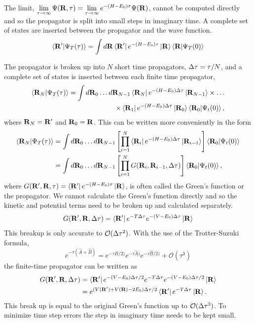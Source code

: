 The limit, $\lim\limits_{\tau\rightarrow\infty}\Psi(\mathbf{R},\tau) = \lim\limits_{\tau\rightarrow\infty}e^{-(H-E_0)\tau}\Psi(\mathbf{R})$, cannot be computed directly and so the propagator is split into small steps in imaginary time. A complete set of states are inserted between the propagator and the wave function.
\begin{equation}
   \left< \mathbf{R}' | \Psi_T(\tau) \right> = \int d\mathbf{R} \left< \mathbf{R}' \right|e^{-(H-E_0)\tau}\left| \mathbf{R} \right>\left< \mathbf{R} | \Psi_T(0) \right>
\end{equation}

The propagator is broken up into $N$ short time propagators, $\Delta\tau = \tau/N$, and a complete set of states is inserted between each finite time propagator,
\begin{equation}
\begin{split}
   \left< \mathbf{R}_N | \Psi_T(\tau) \right> = \int d\mathbf{R}_0 \ldots d\mathbf{R}_{N-1} \left< \mathbf{R}_N \right|e^{-(H-E_0)\Delta\tau}\left| \mathbf{R}_{N-1} \right> \times \ldots \\
      \times \left< \mathbf{R}_1 \right|e^{-(H-E_0)\Delta\tau}\left| \mathbf{R}_{0} \right> \left< \mathbf{R}_0 | \Psi_t(0) \right>,
\end{split}
\end{equation}
where $\mathbf{R}_N=\mathbf{R}'$ and $\mathbf{R}_0=\mathbf{R}$. This can be written more conveniently in the form
\begin{align}
   \left< \mathbf{R}_N | \Psi_T(\tau) \right> &= \int d\mathbf{R}_0 \ldots d\mathbf{R}_{N-1} \left[\prod\limits_{i=1}^N \left< \mathbf{R}_i \right|e^{-(H-E_0)\Delta\tau}\left| \mathbf{R}_{i-1} \right>\right] \left< \mathbf{R}_0 | \Psi_t(0) \right> \\
   &= \int d\mathbf{R}_0 \ldots d\mathbf{R}_{N-1} \left[\prod\limits_{i=1}^N G(\mathbf{R}_i,\mathbf{R}_{i-1},\Delta\tau)\right] \left< \mathbf{R}_0 | \Psi_t(0) \right>,
\end{align}
where $G(\mathbf{R}',\mathbf{R},\tau)=\left< \mathbf{R}' \right|e^{-(H-E_0)\tau}\left| \mathbf{R} \right>$, is often called the Green's function or the propagator. We cannot calculate the Green's function directly and so the kinetic and potential terms need to be broken up and calculated separately.
\begin{equation}
   G(\mathbf{R}',\mathbf{R},\Delta\tau) = \left< \mathbf{R}' \right|e^{-T\Delta\tau}e^{-(V-E_0)\Delta\tau}\left| \mathbf{R} \right>
\end{equation}
This breakup is only accurate to $\mathcal{O}(\Delta\tau^2)$. With the use of the Trotter-Suzuki formula,
\begin{equation}
   e^{-\tau\left(\hat{A}+\hat{B}\right)} = e^{-\tau\hat{B}/2)}e^{-\tau\hat{A})}e^{-\tau\hat{B}/2)} + \mathcal{O}(\tau^3)
\end{equation}
the finite-time propagator can be written as
\begin{align}
   G(\mathbf{R}',\mathbf{R},\Delta\tau) &= \left< \mathbf{R}' \right|e^{-(V-E_0)\Delta\tau/2}e^{-T\Delta\tau}e^{-(V-E_0)\Delta\tau/2}\left| \mathbf{R} \right> \\
   &= e^{(V(\mathbf{R}')+V(\mathbf{R})-2E_0)\Delta\tau/2}\left< \mathbf{R}' \right|e^{-T\Delta\tau}\left| \mathbf{R} \right>.
\end{align}
This break up is equal to the original Green's function up to $\mathcal{O}(\Delta\tau^3)$. To minimize time step errors the step in imaginary time needs to be kept small.

